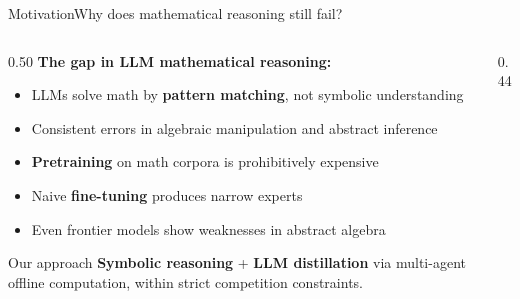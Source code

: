 \documentclass[aspectratio=169,10pt]{beamer}
\newcommand{\hl}[1]{\textcolor{AccentRed}{\textbf{#1}}}
\newcommand{\cy}[1]{\textcolor{AccentBlue}{\textbf{#1}}}
\begin{document}
\begin{frame}{Motivation}{Why does mathematical reasoning still fail?}
\begin{columns}[T,onlytextwidth]
  \begin{column}{0.50\textwidth}
    \vspace{2mm}
    \cy{The gap in LLM mathematical reasoning:}
    \vspace{1mm}
    \begin{itemize}\setlength\itemsep{2pt}
      \item LLMs solve math by \hl{pattern matching}, not symbolic understanding
      \item Consistent errors in algebraic manipulation and abstract inference
      \item \textbf{Pretraining} on math corpora is prohibitively expensive
      \item Naive \textbf{fine-tuning} produces narrow experts
      \item Even frontier models show weaknesses in abstract algebra
    \end{itemize}
    \vspace{2mm}
    \begin{block}{Our approach}
      \textbf{Symbolic reasoning} + \textbf{LLM distillation} via
      multi-agent offline computation, within strict competition constraints.
    \end{block}
  \end{column}
  \hfill
  \begin{column}{0.44\textwidth}
    \vspace{4mm}
  \end{column}
\end{columns}
\end{frame}
\end{document}
